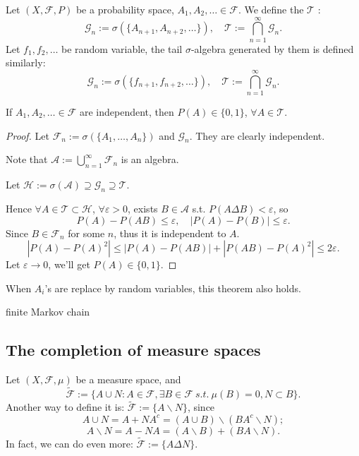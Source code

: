 Let $(X,\mathscr{F},P)$ be a probability space,
$A_1,A_2,\dots\in \mathscr{F}$.
We define the  $\mathscr{T}$ :
\[
\mathscr{G}_n := \sigma(\{A_{n+1},A_{n+2},\dots\}),
\quad \mathscr{T}:= \bigcap_{n=1}^\infty \mathscr{G}_n.
\]
Let $f_1,f_2,\dots$ be random variable, the tail $\sigma$-algebra
generated by them is defined similarly:
\[
\mathscr{G}_n:=\sigma(\{f_{n+1},f_{n+2},\dots\}),\quad
\mathscr{T}:=\bigcap_{n=1}^\infty \mathscr{G}_n.
\]

\begin{theorem}
    If $ A_1,A_2,\dots\in \mathscr{F}$ are independent, then $P(A) \in \{0,1\}$,
	$\forall A\in \mathscr{T}$.
\end{theorem}
\begin{proof}[Proof]
    Let $\mathscr{F}_n := \sigma(\{A_1,\dots,A_n\})$ and $\mathscr{G}_n$.
	They are clearly independent.

	Note that $\mathscr{A} := \bigcup_{n=1}^\infty \mathscr{F}_n$ is an algebra.

	Let $\mathscr{H}:=\sigma(\mathscr{A}) \supseteq \mathscr{G}_n \supseteq \mathscr{T}$.

	Hence $\forall A\in \mathscr{T}\subset \mathscr{H}$, $\forall \varepsilon>0$,
	exists  $B\in \mathscr{A}$ s.t. $P(A\Delta B)<\varepsilon$,
	so
	\[
	P(A)-P(AB)\le \varepsilon,\quad |P(A)-P(B)|\le \varepsilon.
	\]
	Since $B\in \mathscr{F}_n$ for some $n$, thus it is independent to $A$.
	\[
	|P(A)-P(A)^2|\le |P(A)-P(AB)|+|P(AB)-P(A)^2|\le 2\varepsilon.
	\]
	Let $\varepsilon \to 0$, we'll get  $P(A)\in \{0,1\}$.
\end{proof}
\begin{remark}
    When $A_i$'s are replace by random variables, this theorem also holds.
\end{remark}

\begin{example}
    finite Markov chain
\end{example}

\subsection{The completion of measure spaces}
\label{sub:The completion of measure spaces}
Let $(X,\mathscr{F},\mu)$ be a measure space, and
\[
	\widetilde{\mathscr{F}}:= \{A\cup N: A\in \mathscr{F}, \exists B\in \mathscr{F}
	\ s.t.\ \mu(B) = 0, N \subset B\}.
\]
Another way to define it is: $\widetilde{\mathscr{F}}:=\{A\backslash N\}$,
since
\[
A\cup N = A + NA^c = (A\cup B)\backslash (BA^c \backslash N);
\]
\[
A\backslash N = A - NA = (A\backslash B) + (BA\backslash N).
\]
In fact, we can do even more: $\widetilde{\mathscr{F}}:=\{A\Delta N\}$.

